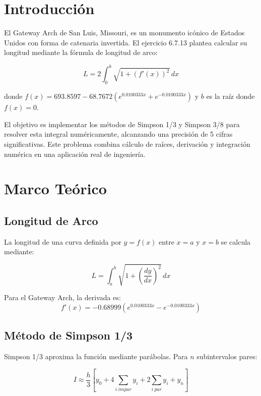 \documentclass[conference]{IEEEtran}
\begin{document}
\section{Introducción}

El Gateway Arch de San Luis, Missouri, es un monumento icónico de Estados Unidos con forma de catenaria invertida. El ejercicio 6.7.13 plantea calcular su longitud mediante la fórmula de longitud de arco:

\begin{equation}
L = 2\int_{0}^{b} \sqrt{1 + \left(f'(x)\right)^2} \, dx
\end{equation}

donde $f(x) = 693.8597 - 68.7672\left(e^{0.0100333x} + e^{-0.0100333x}\right)$ y $b$ es la raíz donde $f(x) = 0$.

El objetivo es implementar los métodos de Simpson 1/3 y Simpson 3/8 para resolver esta integral numéricamente, alcanzando una precisión de 5 cifras significativas. Este problema combina cálculo de raíces, derivación y integración numérica en una aplicación real de ingeniería.

\section{Marco Teórico}

\subsection{Longitud de Arco}

La longitud de una curva definida por $y = f(x)$ entre $x = a$ y $x = b$ se calcula mediante:

\begin{equation}
L = \int_{a}^{b} \sqrt{1 + \left(\frac{dy}{dx}\right)^2} \, dx
\end{equation}

Para el Gateway Arch, la derivada es:
\begin{equation}
f'(x) = -0.68999\left(e^{0.0100333x} - e^{-0.0100333x}\right)
\end{equation}

\subsection{Método de Simpson 1/3}

Simpson 1/3 aproxima la función mediante parábolas. Para $n$ subintervalos pares:

\begin{equation}
I \approx \frac{h}{3}\left[y_0 + 4\sum_{i\ impar}y_i + 2\sum_{i\ par}y_i + y_n\right]
\end{equation}
\end{document}
